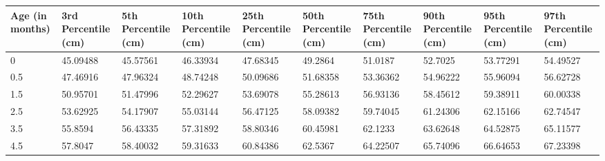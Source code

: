 \documentclass[10pt,twocolumn,letterpaper]{article}
\begin{document}
\begin{table}
    \begin{tabular}{llllllllll}
    Age (in months) & 3rd Percentile (cm) & 5th Percentile (cm) & 10th Percentile (cm) & 25th Percentile (cm) & 50th Percentile (cm) & 75th Percentile (cm) & 90th Percentile (cm) & 95th Percentile (cm) & 97th Percentile (cm) \\
		\hline
    0               & 45.09488                               & 45.57561                               & 46.33934                                & 47.68345                                & 49.2864                                 & 51.0187                                 & 52.7025                                 & 53.77291                                & 54.49527                                \\
    0.5             & 47.46916                               & 47.96324                               & 48.74248                                & 50.09686                                & 51.68358                                & 53.36362                                & 54.96222                                & 55.96094                                & 56.62728                                \\
    1.5             & 50.95701                               & 51.47996                               & 52.29627                                & 53.69078                                & 55.28613                                & 56.93136                                & 58.45612                                & 59.38911                                & 60.00338                                \\
    2.5             & 53.62925                               & 54.17907                               & 55.03144                                & 56.47125                                & 58.09382                                & 59.74045                                & 61.24306                                & 62.15166                                & 62.74547                                \\
    3.5             & 55.8594                                & 56.43335                               & 57.31892                                & 58.80346                                & 60.45981                                & 62.1233                                 & 63.62648                                & 64.52875                                & 65.11577                                \\
    4.5             & 57.8047                                & 58.40032                               & 59.31633                                & 60.84386                                & 62.5367                                 & 64.22507                                & 65.74096                                & 66.64653                                & 67.23398                                \\

\end{tabular}
\end{table}
\end{document}
